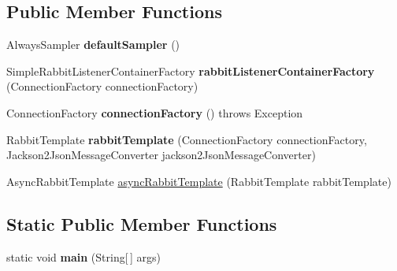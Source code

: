 \subsection*{Public Member Functions}
\begin{DoxyCompactItemize}
\item 
\mbox{\label{classeu_1_1h2020_1_1symbiote_1_1CoreResourceAccessMonitorApplication_a77cd3f3ac1cd8247d43679a7c3d67a0b}} 
Always\+Sampler {\bfseries default\+Sampler} ()
\item 
\mbox{\label{classeu_1_1h2020_1_1symbiote_1_1CoreResourceAccessMonitorApplication_a511d4f9d77b66d6c647b68fb1ad3e797}} 
Simple\+Rabbit\+Listener\+Container\+Factory {\bfseries rabbit\+Listener\+Container\+Factory} (Connection\+Factory connection\+Factory)
\item 
\mbox{\label{classeu_1_1h2020_1_1symbiote_1_1CoreResourceAccessMonitorApplication_a14fb66e3a9c4ef134ef0bb31aaaafbdf}} 
Connection\+Factory {\bfseries connection\+Factory} ()  throws Exception 
\item 
\mbox{\label{classeu_1_1h2020_1_1symbiote_1_1CoreResourceAccessMonitorApplication_a4b518b81cb1ef9ba85e823abd4ec4fd6}} 
Rabbit\+Template {\bfseries rabbit\+Template} (Connection\+Factory connection\+Factory, Jackson2\+Json\+Message\+Converter jackson2\+Json\+Message\+Converter)
\item 
Async\+Rabbit\+Template \hyperlink{classeu_1_1h2020_1_1symbiote_1_1CoreResourceAccessMonitorApplication_a5ddd9256ae88e6362a7e76b640d24f50}{async\+Rabbit\+Template} (Rabbit\+Template rabbit\+Template)
\end{DoxyCompactItemize}
\subsection*{Static Public Member Functions}
\begin{DoxyCompactItemize}
\item 
\mbox{\label{classeu_1_1h2020_1_1symbiote_1_1CoreResourceAccessMonitorApplication_adbc7e65218ff32b0690b9114cda8aad3}} 
static void {\bfseries main} (String\mbox{[}$\,$\mbox{]} args)
\end{DoxyCompactItemize}


